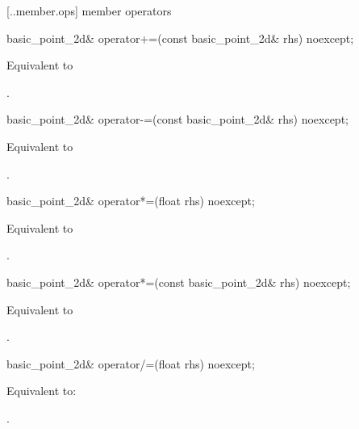  [\iotwod.\pointtwod.member.ops] { member operators}

%
\begin{itemdecl}
basic_point_2d& operator+=(const basic_point_2d& rhs) noexcept;
\end{itemdecl}
\begin{itemdescr}
\pnum
\effects
Equivalent to 
	
\pnum
\returns
{}.
\end{itemdescr}

%
\begin{itemdecl}
basic_point_2d& operator-=(const basic_point_2d& rhs) noexcept;
\end{itemdecl}
\begin{itemdescr}
\pnum
\effects
Equivalent to 

\pnum
\returns
{}.
\end{itemdescr}

%
\begin{itemdecl}
basic_point_2d& operator*=(float rhs) noexcept;
\end{itemdecl}
\begin{itemdescr}
\pnum
\effects
Equivalent to 

\pnum
\returns
{}.
\end{itemdescr}

%
\begin{itemdecl}
basic_point_2d& operator*=(const basic_point_2d& rhs) noexcept;
\end{itemdecl}
\begin{itemdescr}
\pnum
\effects
Equivalent to 

\pnum
\returns
{}.
\end{itemdescr}

%
\begin{itemdecl}
basic_point_2d& operator/=(float rhs) noexcept;
\end{itemdecl}
\begin{itemdescr}
\pnum
\effects
Equivalent to: 

\pnum
\returns
{}.
\end{itemdescr}

